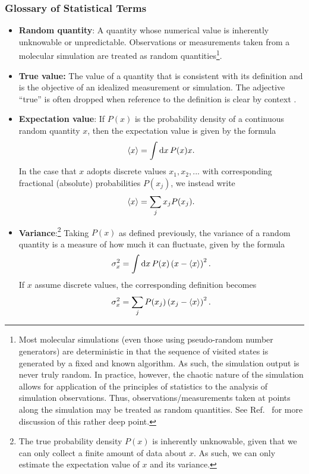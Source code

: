 \subsubsection{Glossary of Statistical Terms}
\begin{itemize}

\item {\bf Random quantity}: A quantity whose numerical value is inherently unknowable or unpredictable.
  Observations or measurements taken from a molecular simulation are treated as random quantities\footnote{Most molecular simulations (even those using pseudo-random number generators) are deterministic in that the sequence of visited states is generated by a fixed and known algorithm.  As such, the simulation output is never truly random.
In practice, however, the chaotic nature of the simulation allows for application of the principles of statistics to the analysis of simulation observations.
Thus, observations/measurements taken at points along the simulation may be treated as random quantities.
See Ref.~\cite{Leimkuhler} for more discussion of this rather deep point.}.

\item {\bf True value:}  The value of a quantity that is consistent with its definition and is the objective of an idealized measurement or simulation. The adjective ``true'' is often dropped when reference to the definition is clear by context \citep{JCGM:GUM2008,JCGM:VIM2012}.
  \label{def:true_value}

\item {\bf Expectation value}:  If $P(x)$ is the probability density of a continuous random quantity $x$, then the expectation value is given by the formula
\begin{align}
  \langle x \rangle = \int {\rm d}x\, P(x) x.
\end{align}
In the case that $x$ adopts discrete values $x_1,x_2,...$ with corresponding fractional (absolute) probabilities $P(x_j)$, we instead write
\begin{align}
  \langle x \rangle = \sum_j x_j P(x_j).
\end{align}

\item {\bf Variance}:\footnote{The true probability density $P(x)$ is inherently unknowable, given that we can only collect a finite amount of data about $x$.  As such, we can only estimate the expectation value of $x$ and its variance.} Taking $P(x)$ as defined previously, the variance of a random quantity is a measure of how much it can fluctuate, given by the formula
\begin{align}
\sigma_x^2 = \int {\rm d}x\, P(x) \left( x  - \langle x \rangle \right)^2.
\end{align}
If $x$ assume discrete values, the corresponding definition becomes
\begin{align}
\sigma_x^2 = \sum_j P(x_j) \left( x_j  - \langle x \rangle \right)^2.
\end{align}


\end{itemize}

